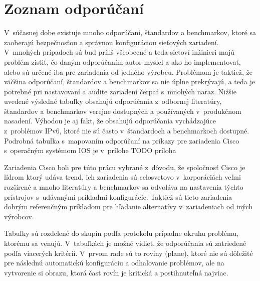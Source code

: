\newpage
\section{Zoznam odporúčaní}

V~súčasnej dobe existuje mnoho odporúčaní, štandardov a benchmarkov, ktoré sa zaoberajú bezpečnosťou a správnou konfiguráciou sieťových zariadení. V~mnohých prípadoch sú buď príliš všeobecné a teda sieťoví inžinieri majú problém zistiť, čo daným odporúčaním autor myslel a ako ho implementovať, alebo sú určené iba pre zariadenia od jedného výrobcu. Problémom je taktiež, že väčšina odporúčaní, štandardov a benchmarkov sa nie úplne prekrývajú, a teda je potrebné pri nastavovaní a audite zariadení čerpať s~mnohých naraz. Nižšie uvedené výsledné tabuľky obsahujú odporúčania z~odbornej literatúry, štandardov a benchmarkov verejne dostupných a používaných v~produkčnom nasadení. Výhodou je aj fakt, že obsahujú odporúčania vychádzajúce z~problémov IPv6, ktoré nie sú často v~štandardoch a benchmarkoch dostupné. Podrobná tabuľka s~mapovaním odporúčaní na príkazy pre zariadenia Cisco s~operačným systémom IOS je v~prílohe TODO príloha %

Zariadenia Cisco boli pre túto prácu vybrané z~dôvodu, že spoločnosť Cisco je lídrom ktorý udáva trend, ich zariadenia sú celosvetovo v~korporáciách veľmi rozšírené a mnoho literatúry a benchmarkov sa odvoláva na nastavenia týchto prístrojov s~udávanými príkladmi konfigurácie. Taktiež sú tieto zariadenia dobrým referenčným príkladom pre hľadanie alternatívy v~zariadeniach od iných výrobcov.

Tabuľky sú rozdelené do skupín podľa protokolu prípadne okruhu problému, ktorému sa venujú. V~tabuľkách je možné vidieť, že odporúčania sú zatriedené podľa viacerých kritérií. V~prvom rade sú to roviny (plane), ktoré nie sú dôležité pre následnú automatickú konfiguráciu a odhaľovanie problémov, ale na vytvorenie si obrazu, ktorá časť rovín je kritická a postihnuteľná najviac. 

